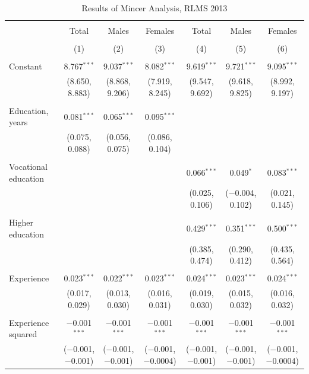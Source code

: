 \documentclass[12pt,a4paper]{article}
\numberwithin{equation}{section}
\begin{document}
\begin{landscape}
	
	\fontsize{9}{11}
	\selectfont
	
	\begin{table}[!htbp] \centering 
		\caption{Results of Mincer Analysis, RLMS 2013} 
		\label{} 
		\begin{tabular}{@{\extracolsep{5pt}}lcccccc} 
			\\[-1.8ex]\hline 
			\hline \\[-1.8ex] 
			& Total & Males & Females & Total & Males & Females \\ 
			\\[-1.8ex] & (1) & (2) & (3) & (4) & (5) & (6)\\ 
			\hline \\[-1.8ex] 
			Constant & 8.767$^{***}$ & 9.037$^{***}$ & 8.082$^{***}$ & 9.619$^{***}$ & 9.721$^{***}$ & 9.095$^{***}$ \\ 
			& (8.650, 8.883) & (8.868, 9.206) & (7.919, 8.245) & (9.547, 9.692) & (9.618, 9.825) & (8.992, 9.197) \\ 
			& & & & & & \\ 
			Education, years & 0.081$^{***}$ & 0.065$^{***}$ & 0.095$^{***}$ &  &  &  \\ 
			& (0.075, 0.088) & (0.056, 0.075) & (0.086, 0.104) &  &  &  \\ 
			& & & & & & \\ 
			Vocational education &  &  &  & 0.066$^{***}$ & 0.049$^{*}$ & 0.083$^{***}$ \\ 
			&  &  &  & (0.025, 0.106) & ($-$0.004, 0.102) & (0.021, 0.145) \\ 
			& & & & & & \\ 
			Higher education &  &  &  & 0.429$^{***}$ & 0.351$^{***}$ & 0.500$^{***}$ \\ 
			&  &  &  & (0.385, 0.474) & (0.290, 0.412) & (0.435, 0.564) \\ 
			& & & & & & \\ 
			Experience & 0.023$^{***}$ & 0.022$^{***}$ & 0.023$^{***}$ & 0.024$^{***}$ & 0.023$^{***}$ & 0.024$^{***}$ \\ 
			& (0.017, 0.029) & (0.013, 0.030) & (0.016, 0.031) & (0.019, 0.030) & (0.015, 0.032) & (0.016, 0.032) \\ 
			& & & & & & \\ 
			Experience squared & $-$0.001$^{***}$ & $-$0.001$^{***}$ & $-$0.001$^{***}$ & $-$0.001$^{***}$ & $-$0.001$^{***}$ & $-$0.001$^{***}$ \\ 
			& ($-$0.001, $-$0.001) & ($-$0.001, $-$0.001) & ($-$0.001, $-$0.0004) & ($-$0.001, $-$0.001) & ($-$0.001, $-$0.001) & ($-$0.001, $-$0.0004) \\ 

\end{tabular}
\end{table}
\end{landscape}
\end{document}
